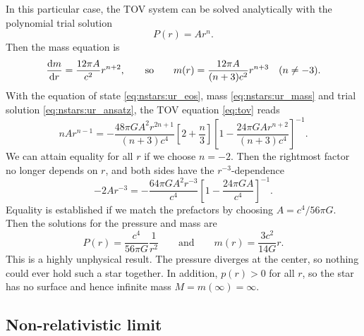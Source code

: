 In this particular case, the TOV system  can be solved analytically with the polynomial trial solution
\begin{equation}
	P(r) = A r^n .
\label{eq:nstars:ur_ansatz}
\end{equation}
Then the mass equation  is
\begin{equation}
	\odv{m}{r} = \frac{12 \pi A}{c^2} r^{n+2},
	\qquad \text{so} \qquad
	m(r) = \frac{12 \pi A}{(n+3) c^2} r^{n+3}
	\quad (n \neq -3).
\label{eq:nstars:ur_mass}
\end{equation}
With the equation of state \eqref{eq:nstars:ur_eos}, mass \eqref{eq:nstars:ur_mass} and trial solution \eqref{eq:nstars:ur_ansatz}, the TOV equation \eqref{eq:tov} reads
\begin{equation}
	n A r^{n-1} =
	-\frac{48 \pi G A^2 r^{2n+1}}{(n+3) c^4} \left[ 2 + \frac{n}{3} \right] \left[ 1 - \frac{24 \pi G A r^{n+2}}{(n+3) c^4} \right]^{-1} .
\end{equation}
We can attain equality for all $r$ if we choose $n = -2$.
Then the rightmost factor no longer depends on $r$, and both sides have the $r^{-3}$-dependence
\begin{equation}
	- 2 A r^{-3} = - \frac{64 \pi G A^2 r^{-3}}{c^4} \left[ 1 - \frac{24 \pi G A}{c^4} \right]^{-1} .
\end{equation}
Equality is established if we match the prefactors by choosing $A = c^4 / 56 \pi G$.
Then the solutions for the pressure and mass are
\begin{equation}
	P(r) = \frac{c^4}{56 \pi G} \frac{1}{r^2}
	\qquad \text{and} \qquad
	m(r) = \frac{3 c^2}{14 G} r .
\end{equation}
This is a highly unphysical result.
The pressure diverges at the center, so nothing could ever hold such a star together.
In addition, $p(r) > 0$ for all $r$, so the star has no surface and hence infinite mass $M = m(\infty) = \infty$.


\subsection{Non-relativistic limit}
\label{sec:nstars:nr_limit}

